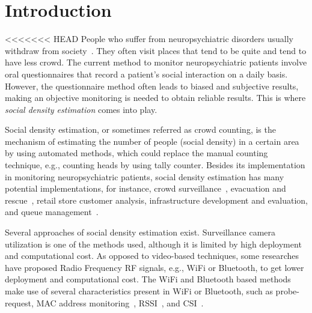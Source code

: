 \chapter{Introduction}\label{ch:introduction}

<<<<<<< HEAD
People who suffer from neuropsychiatric disorders usually withdraw from society~\cite{thesis084,thesis083}. They often visit places that tend to be quite and tend to have less crowd. The current method to monitor neuropsychiatric patients involve oral questionnaires that record a patient's social interaction on a daily basis. However, the questionnaire method often leads to biased and subjective results, making an objective monitoring is needed to obtain reliable results.
This is where \textit{social density estimation} comes into play.

Social density estimation, or sometimes referred as crowd counting, is the mechanism of estimating the number of people (social density) in a certain area by using automated methods, which could replace the manual counting technique, e.g., counting heads by using tally counter. Besides its implementation in monitoring neuropsychiatric patients, social density estimation has many potential implementations, for instance, crowd surveillance~\cite{thesis050}, evacuation and rescue~\cite{thesis045}, retail store customer analysis, infrastructure development and evaluation, and queue management~\cite{thesis012}.

Several approaches of social density estimation exist. Surveillance camera utilization is one of the methods used, although it is limited by high deployment and computational cost. As opposed to video-based techniques, some researches have proposed Radio Frequency RF signals, e.g., WiFi or Bluetooth, to get lower deployment and computational cost. The WiFi and Bluetooth based methods make use of several characteristics present in WiFi or Bluetooth, such as probe-request, \ac{MAC} address monitoring~\cite{thesis008}, \ac{RSSI}~\cite{thesis046}, and \ac{CSI}~\cite{thesis051}. 

